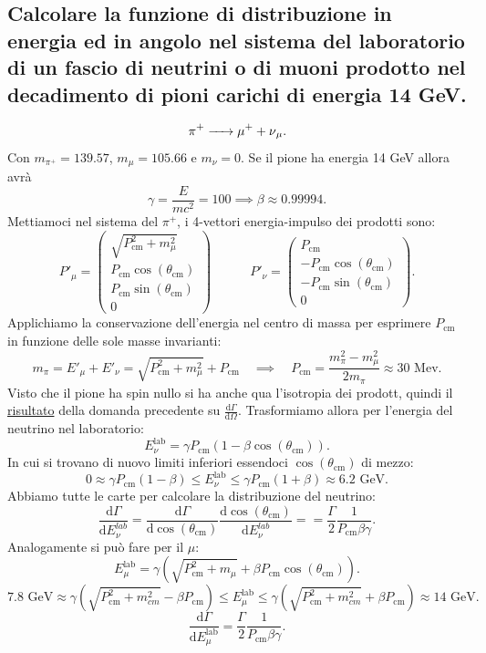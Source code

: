 \subsection[]{ Calcolare la funzione di distribuzione in energia ed in angolo nel sistema del laboratorio di un fascio di neutrini o di muoni prodotto nel decadimento di pioni carichi di energia 14 GeV.}
\[
	\ce{\ce{\pi^+} -> \ce{\mu^+} + \ce{\nu_{\mu}}}
.\] 
Con  $m_{\pi^+} = 139.57$, $m_{\mu}=105.66$ e $m_{\nu}=0$. Se il pione ha energia 14 GeV allora avrà
\[
\gamma = \frac{E}{mc^2} = 100 \implies \beta \approx 0.99994
.\] 
Mettiamoci nel sistema del $\pi^+$, i 4-vettori energia-impulso dei prodotti sono:
\[
P'_{\mu} =  
\begin{pmatrix}
	\sqrt{P_{\text{cm}}^2+m_{\mu}^2}  \\
	P_{\text{cm}}\cos\left( \theta_{\text{cm}} \right) \\
	P_{\text{cm}}\sin\left( \theta_{\text{cm}} \right) \\
	0
\end{pmatrix} \quad \quad \quad 
P'_{\nu} = 
\begin{pmatrix} 
	P_{\text{cm}} \\
	-P_{\text{cm}}\cos\left( \theta_{\text{cm}} \right) \\
	-P_{\text{cm}}\sin\left( \theta_{\text{cm}} \right) \\
	0
\end{pmatrix} 
.\] 
Applichiamo la conservazione dell'energia nel centro di massa per esprimere $P_{\text{cm}}$ in funzione delle sole masse invarianti:
\[
	m_{\pi} = E'_{\mu} + E'_{\nu} =
	\sqrt{P_{\text{cm}}^2 + m_{\mu}^2} + P_{\text{cm}} \quad \implies
	\quad P_{\text{cm}} = \frac{m_{\pi}^2 - m_{\mu}^2}{2m_{\pi}} \approx 30\text{ Mev}
.\]
Visto che il pione ha spin nullo si ha anche qua l'isotropia dei prodott, quindi il \hyperref[eq:isotropia]{risultato} della domanda precedente su $\frac{\text{d}\Gamma}{\text{d}\Omega}$.
Trasformiamo allora per l'energia del neutrino nel laboratorio:
\[
	E_{\nu}^{\text{lab}}=\gamma P_{\text{cm}} \left(1-\beta\cos\left( \theta_{\text{cm}}\right)\right) 
.\] 
In cui si trovano di nuovo limiti inferiori essendoci $\cos\left( \theta_{\text{cm}} \right) $ di mezzo:
\[
	0 \approx \gamma P_{\text{cm}}\left( 1-\beta \right) \le E_{\nu}^{\text{lab}}\le \gamma P_{\text{cm}}\left( 1+\beta \right) \approx 6.2 \text{ GeV}
.\] 
Abbiamo tutte le carte per calcolare la distribuzione del neutrino:
\[
	\frac{\mbox{d} \Gamma}{\mbox{d} E_{\nu}^{lab}} = 
	\frac{\mbox{d} \Gamma}{\text{d}\cos\left( \theta_{\text{cm}} \right) } \frac{\text{d}\cos\left( \theta_{\text{cm}} \right) }{\mbox{d} E_{\nu}^{lab}} =
	= \frac{\Gamma}{2}\frac{1}{P_{\text{cm}}\beta \gamma}
.\] 
Analogamente si può fare per il $\mu$:
\[
	E_{\mu}^{\text{lab}}=\gamma\left( \sqrt{P_{\text{cm}}^2+m_{\mu}} + \beta P_{\text{cm}}\cos\left( \theta_{\text{cm}}\right)\right)
.\] 
\[
	7.8 \text{ GeV} \approx \gamma\left( \sqrt{P_{\text{cm}}^2 + m_{cm}^2} - \beta P_{\text{cm}} \right) \le E_{\mu}^{\text{lab}} \le 
	\gamma\left( \sqrt{P_{\text{cm}}^2 + m_{cm}^2} + \beta P_{\text{cm}} \right)  \approx 14 \text{ GeV}
.\] 
\[
\frac{\mbox{d} \Gamma}{\mbox{d} E_{\mu}^{\text{lab}}} = \frac{\Gamma}{2}\frac{1}{P_{\text{cm}}\beta \gamma}
.\] 

